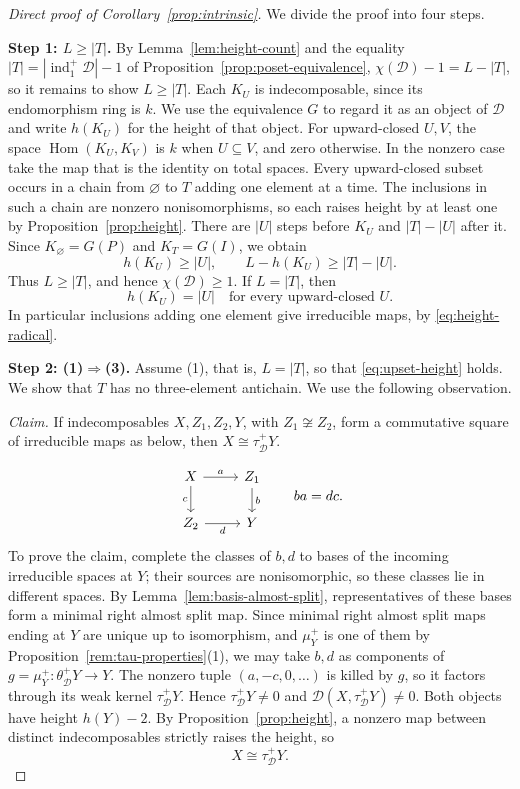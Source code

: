 \documentclass[a4paper,reqno,10pt]{amsart}
\theoremstyle{definition}
\numberwithin{equation}{section}
\DeclareMathOperator{\ind}{ind}
\DeclareMathOperator{\Hom}{Hom}
\newcommand{\cD}{\mathcal D}
\begin{document}
\begin{proof}[Direct proof of Corollary~\ref{prop:intrinsic}]
We divide the proof into four steps.

\textbf{Step 1: \(L\geq|T|\).}
By Lemma~\ref{lem:height-count} and the equality
\(|T|=|\ind_1^+\cD|-1\) of Proposition~\ref{prop:poset-equivalence},
\(\chi(\cD)-1=L-|T|\), so it remains to show \(L\geq|T|\).
Each \(K_U\) is indecomposable, since its endomorphism ring is \(k\).
We use the equivalence \(G\) to regard it as an object of \(\cD\) and
write \(h(K_U)\) for the height of that object.
For upward-closed \(U,V\), the space \(\Hom(K_U,K_V)\) is \(k\) when
\(U\subseteq V\), and zero otherwise. In the nonzero case take the map
that is the identity on total spaces. Every upward-closed subset occurs
in a chain from \(\varnothing\) to \(T\) adding one element at a time.
The inclusions in such a chain are nonzero nonisomorphisms, so each raises
height by at least one by Proposition~\ref{prop:height}. There are
\(|U|\) steps before \(K_U\) and \(|T|-|U|\) after it. Since
\(K_\varnothing=G(P)\) and \(K_T=G(I)\), we obtain
\[
 h(K_U)\geq|U|,\qquad L-h(K_U)\geq|T|-|U|.
\]
Thus \(L\geq|T|\), and hence \(\chi(\cD)\geq1\).
If \(L=|T|\), then
\begin{equation}\label{eq:upset-height}
 h(K_U)=|U|\quad\text{for every upward-closed }U.
\end{equation}
In particular inclusions adding one element give irreducible maps, by
\eqref{eq:height-radical}.

\textbf{Step 2: (1)\(\Rightarrow\)(3).}
Assume (1), that is, \(L=|T|\), so that \eqref{eq:upset-height} holds.
We show that \(T\) has no three-element antichain.
We use the following observation.

\emph{Claim.} If indecomposables \(X,Z_1,Z_2,Y\), with \(Z_1\not\cong Z_2\),
form a commutative square of irreducible maps as below, then
\(X\cong\tau_{\cD}^+Y\).

\[
\begin{tikzcd}
 X\arrow[r,"a"]\arrow[d,"c"']&Z_1\arrow[d,"b"]\\
 Z_2\arrow[r,"d"']&Y
\end{tikzcd}
\qquad ba=dc.
\]
To prove the claim, complete the classes of \(b,d\) to bases of the
incoming irreducible spaces at \(Y\); their sources are nonisomorphic,
so these classes lie in different spaces. By
Lemma~\ref{lem:basis-almost-split}, representatives of these bases form a
minimal right almost split map.
Since minimal right almost split maps ending at \(Y\) are unique up to
isomorphism, and \(\mu_Y^+\) is one of them by
Proposition~\ref{rem:tau-properties}(1), we may take \(b,d\) as components
of \(g=\mu_Y^+:\theta_{\cD}^+Y\to Y\). The nonzero tuple \((a,-c,0,\ldots)\)
is killed by \(g\), so it factors through its weak kernel \(\tau_{\cD}^+Y\).
Hence \(\tau_{\cD}^+Y\ne0\) and \(\cD(X,\tau_{\cD}^+Y)\ne0\).
Both objects have height \(h(Y)-2\). By Proposition~\ref{prop:height},
a nonzero map between distinct indecomposables strictly raises the
height, so
\begin{equation}\label{eq:square-translate}
 X\cong\tau_{\cD}^+Y.
\end{equation}


\end{proof}
\end{document}
